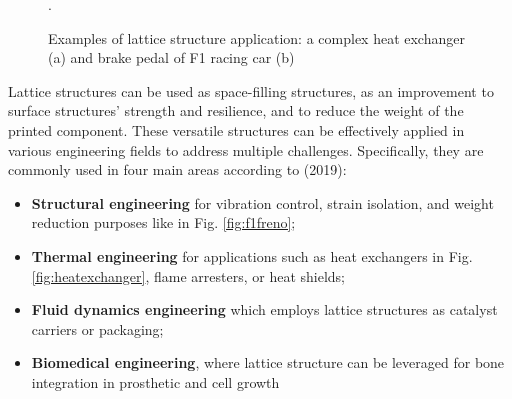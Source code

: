 \begin{figure}
    \centering
    \qquad
    \caption[Lattice structure applications.]{Examples of lattice structure application: a complex heat exchanger (a) and brake pedal of F1 racing car (b) \cite{milewski_additive_2017, du_plessis_beautiful_2019}}.
\end{figure}
Lattice structures can be used as space-filling structures, as an improvement to surface structures' strength and resilience, and to reduce the weight of the printed component. These versatile structures can be effectively applied in various engineering fields to address multiple challenges. Specifically, they are commonly used in four main areas according to \citeauthor{bhate_classification_2019} (2019): 
\begin{itemize}
    \item \textbf{Structural engineering} for vibration control, strain isolation, and weight reduction purposes like in Fig. \ref{fig:f1freno};
    \item \textbf{Thermal engineering} for applications such as heat exchangers in Fig. \ref{fig:heatexchanger}, flame arresters, or heat shields;
    \item \textbf{Fluid dynamics engineering} which employs lattice structures as catalyst carriers or packaging;
    \item \textbf{Biomedical engineering}, where lattice structure can be leveraged for bone integration in prosthetic and cell growth
\end{itemize}
